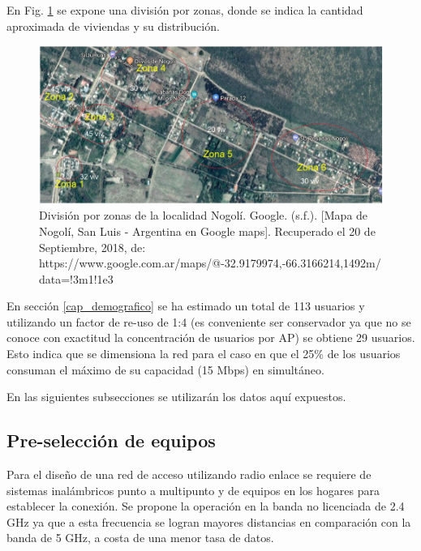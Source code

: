 \documentclass[12pt,a4paper]{book}
\begin{document}
\medskip

En Fig. \ref{Fig_Division_zonas_Nogoli} se expone una división por zonas, donde se indica la cantidad aproximada de viviendas y su distribución.

\medskip

\begin{figure} [H]
\centering
\includegraphics[width= 17cm]{../figuras/Div_por_zonas_Nogoli.JPG}
\caption{División por zonas de la localidad Nogolí. Google. (s.f.). [Mapa de Nogolí, San Luis - Argentina en Google maps]. Recuperado el 20 de Septiembre, 2018, de: https://www.google.com.ar/maps/@-32.9179974,-66.3166214,1492m/data=!3m1!1e3}
\label{Fig_Division_zonas_Nogoli}
\end{figure}

\medskip 

En sección \ref{cap_demografico} se ha estimado un total de 113 usuarios y utilizando un factor de re-uso de 1:4 (es conveniente ser conservador ya que no se conoce con exactitud la
concentración de usuarios por AP) se obtiene 29 usuarios. Esto indica que
se dimensiona la red para el caso en que el 25\% de los usuarios consuman el
máximo de su capacidad (15 Mbps) en simultáneo.

\medskip

En las siguientes subsecciones se utilizarán los datos aquí expuestos.

\medskip

\subsection{Pre-selección de equipos}\label{subsec_acceso_pre_selec_equipos}

Para el diseño de una red de acceso utilizando radio enlace se requiere de sistemas inalámbricos punto a multipunto y de equipos en los hogares para establecer la conexión. 
Se propone la operación en la banda no licenciada de 2.4 GHz ya que a esta frecuencia se logran mayores distancias en comparación con la banda de 5 GHz, a costa de una menor tasa de datos.
\end{document}
